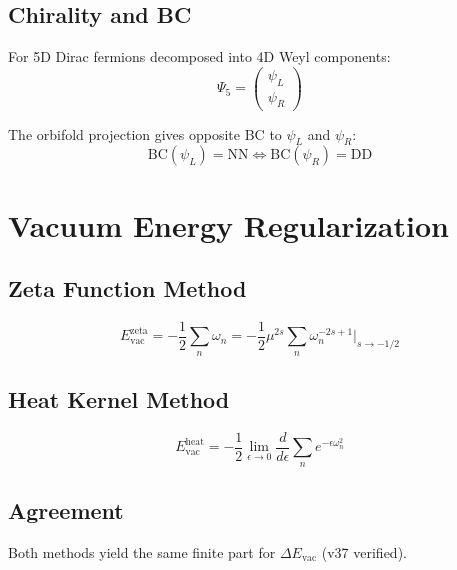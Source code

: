 \documentclass[11pt,a4paper]{article}
\begin{document}
\subsection{Chirality and BC}
\label{app:chirality-bc}

For 5D Dirac fermions decomposed into 4D Weyl components:
\begin{equation}
\label{eq:5d-dirac}
\Psi_5 = \begin{pmatrix} \psi_L \\ \psi_R \end{pmatrix}
\end{equation}

The orbifold projection gives opposite BC to $\psi_L$ and $\psi_R$:
\begin{equation}
\label{eq:orbifold-chirality}
\text{BC}(\psi_L) = \text{NN} \iff \text{BC}(\psi_R) = \text{DD}
\end{equation}

\section{Vacuum Energy Regularization}
\label{app:vac-reg}

\subsection{Zeta Function Method}
\label{app:zeta}

\begin{equation}
\label{eq:zeta-evac}
E_{\text{vac}}^{\text{zeta}} = -\frac{1}{2} \sum_n \omega_n = -\frac{1}{2} \mu^{2s} \sum_n \omega_n^{-2s+1} \bigg|_{s \to -1/2}
\end{equation}

\subsection{Heat Kernel Method}
\label{app:heat}

\begin{equation}
\label{eq:heat-evac}
E_{\text{vac}}^{\text{heat}} = -\frac{1}{2} \lim_{\epsilon \to 0} \frac{d}{d\epsilon} \sum_n e^{-\epsilon \omega_n^2}
\end{equation}

\subsection{Agreement}
\label{app:reg-agreement}

Both methods yield the same finite part for $\Delta E_{\text{vac}}$ (v37 verified).
\end{document}
